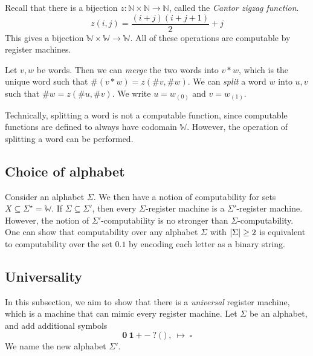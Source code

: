 Recall that there is a bijection \( z \colon \mathbb N \times \mathbb N \to \mathbb N \), called the \emph{Cantor zigzag function}.
\[ z(i,j) = \frac{(i+j)(i+j+1)}{2} + j \]
This gives a bijection \( \mathbb W \times \mathbb W \to \mathbb W \).
All of these operations are computable by register machines.
\begin{definition}
	Let \( v, w \) be words.
	Then we can \emph{merge} the two words into \( v \ast w \), which is the unique word such that \( \#(v \ast w) = z(\#v, \#w) \).
	We can \emph{split} a word \( w \) into \( u, v \) such that \( \#w = z(\#u, \#v) \).
	We write \( u = w_{(0)} \) and \( v = w_{(1)} \).
\end{definition}
Technically, splitting a word is not a computable function, since computable functions are defined to always have codomain \( \mathbb W \).
However, the operation of splitting a word can be performed.

\subsection{Choice of alphabet}
Consider an alphabet \( \Sigma \).
We then have a notion of computability for sets \( X \subseteq \Sigma^\star = \mathbb W \).
If \( \Sigma \subseteq \Sigma' \), then every \( \Sigma \)-register machine is a \( \Sigma' \)-register machine.
However, the notion of \( \Sigma' \)-computability is no stronger than \( \Sigma \)-computability.
One can show that computability over any alphabet \( \Sigma \) with \( \abs{\Sigma} \geq 2 \) is equivalent to computability over the set \( \qty{0,1} \) by encoding each letter as a binary string.

\subsection{Universality}
In this subsection, we aim to show that there is a \emph{universal} register machine, which is a machine that can mimic every register machine.
Let \( \Sigma \) be an alphabet, and add additional symbols
\[ \bm 0\ \bm 1\ \bm +\ \bm -\ \bm ?\ \bm (\ \bm )\ \bm ,\ \bm \mapsto\ \bm \square \]
We name the new alphabet \( \Sigma' \).

